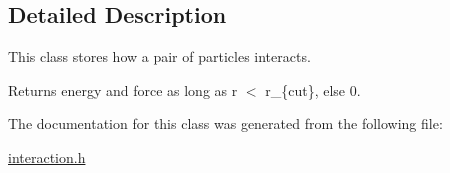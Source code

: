 \subsection{Detailed Description}
This class stores how a pair of particles interacts. 

Returns energy and force as long as r $<$ r\-\_\-\{cut\}, else 0. 

The documentation for this class was generated from the following file\-:\begin{DoxyCompactItemize}
\item 
\hyperlink{interaction_8h}{interaction.\-h}\end{DoxyCompactItemize}
